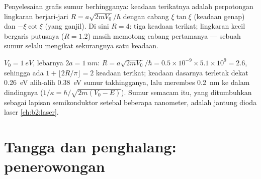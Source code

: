 \begin{omfigure}

{\small Penyelesaian grafis sumur berhingganya: keadaan terikatnya adalah
perpotongan lingkaran berjari-jari $R = a\sqrt{2mV_0}/\hbar$ dengan
cabang $\xi\tan\xi$ (keadaan genap) dan $-\xi\cot\xi$ (yang ganjil). Di sini
$R = 4$: tiga keadaan terikat; lingkaran kecil bergaris putusnya ($R = 1.2$) masih
memotong cabang pertamanya --- sebuah sumur selalu mengikat sekurangnya satu keadaan.}
\end{omfigure}

\begin{example}\label{ex:b2:potential-wells-tunneling:finite}
$V_0 = \qty{1}{eV}$, lebarnya $2a = \qty{1}{nm}$: $R = a\sqrt{2mV_0}/\hbar = 0.5 \times
10^{-9} \times 5.1 \times 10^9 = 2.6$, sehingga ada $1 + \lfloor 2R/\pi\rfloor = 2$ keadaan
terikat; keadaan dasarnya terletak dekat \qty{0.26}{eV} alih-alih \qty{0.38}{eV}
sumur takhingganya, lalu merembes \qty{0.2}{nm} ke dalam dindingnya
($1/\kappa = \hbar/\sqrt{2m(V_0 - E)}$). Sumur semacam itu, yang ditumbuhkan sebagai lapisan
semikonduktor setebal beberapa nanometer, adalah jantung dioda
laser \cref{ch:b2:laser}.
\end{example}

\section{Tangga dan penghalang: penerowongan}

